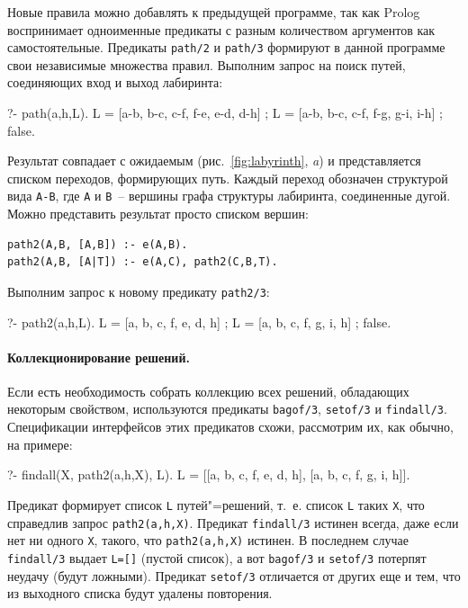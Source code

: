 \documentclass[a4paper,14pt, openany, twoside, final]{extbook} %
\begin{document}
  Новые правила можно добавлять к предыдущей программе, так как Prolog воспринимает одноименные предикаты с разным количеством аргументов как самостоятельные.  Предикаты \texttt{path/2} и \texttt{path/3} формируют в данной программе свои независимые множества правил.  Выполним запрос на поиск путей, соединяющих вход и выход лабиринта:

\begin{proexp}
?- path(a,h,L).
L = [a-b, b-c, c-f, f-e, e-d, d-h] ;
L = [a-b, b-c, c-f, f-g, g-i, i-h] ;
false.
\end{proexp}

Результат совпадает с ожидаемым (рис.~\ref{fig:labyrinth}, \emph{a}) и представляется списком переходов, формирующих путь.  Каждый переход обозначен структурой вида \texttt{A-B}, где \texttt{A} и \texttt{B}~-- вершины графа структуры лабиринта, соединенные дугой.  Можно представить результат просто списком вершин:

\begin{verbatim}
path2(A,B, [A,B]) :- e(A,B).
path2(A,B, [A|T]) :- e(A,C), path2(C,B,T).
\end{verbatim}

\noindent{}Выполним запрос к новому предикату \texttt{path2/3}:

\begin{proexp}
?- path2(a,h,L).
L = [a, b, c, f, e, d, h] ;
L = [a, b, c, f, g, i, h] ;
false.
\end{proexp}

\paragraph{Коллекционирование решений.} Если есть необходимость собрать коллекцию всех решений, обладающих некоторым свойством, используются предикаты \texttt{bagof/3}, \texttt{setof/3} и \texttt{findall/3}.  Спецификации интерфейсов этих предикатов схожи, рассмотрим их, как обычно, на примере:

\begin{proexp}
?- findall(X, path2(a,h,X), L).
L = [[a, b, c, f, e, d, h], [a, b, c, f, g, i, h]].
\end{proexp}

\noindent{}Предикат формирует список \texttt{L} путей"=решений, т.~е. список \texttt{L} таких \texttt{X}, что справедлив запрос \texttt{path2(a,h,X)}.  Предикат \texttt{findall/3} истинен всегда, даже если нет ни одного \texttt{X}, такого, что \texttt{path2(a,h,X)} истинен.  В последнем случае \texttt{findall/3} выдает \texttt{L=[]} (пустой список), а вот \texttt{bagof/3} и \texttt{setof/3} потерпят неудачу (будут ложными).  Предикат \texttt{setof/3} отличается от других еще и тем, что из выходного списка будут удалены повторения.
\end{document}

